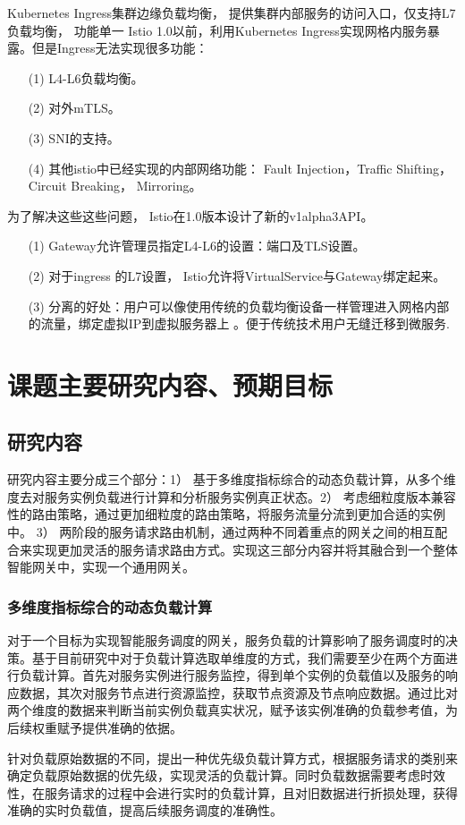 Kubernetes Ingress集群边缘负载均衡， 提供集群内部服务的访问入口，仅支持L7负载均衡， 功能单一
Istio 1.0以前，利用Kubernetes Ingress实现网格内服务暴露。但是Ingress无法实现很多功能：
\begin{itemize}
    \item[(1)] L4-L6负载均衡。
    \item[(2)] 对外mTLS。
    \item[(3)] SNI的支持。
    \item[(4)] 其他istio中已经实现的内部网络功能： Fault Injection，Traffic Shifting， Circuit Breaking， Mirroring。
\end{itemize}
为了解决这些这些问题， Istio在1.0版本设计了新的v1alpha3API。
\begin{itemize}
    \item[(1)] Gateway允许管理员指定L4-L6的设置：端口及TLS设置。
    \item[(2)] 对于ingress 的L7设置， Istio允许将VirtualService与Gateway绑定起来。
    \item[(3)] 分离的好处：用户可以像使用传统的负载均衡设备一样管理进入网格内部的流量，绑定虚拟IP到虚拟服务器上 。便于传统技术用户无缝迁移到微服务.
\end{itemize}

\newpage

\section{课题主要研究内容、预期目标}

\subsection{研究内容}

研究内容主要分成三个部分：1） 基于多维度指标综合的动态负载计算，从多个维度去对服务实例负载进行计算和分析服务实例真正状态。2） 考虑细粒度版本兼容性的路由策略，通过更加细粒度的路由策略，将服务流量分流到更加合适的实例中。 3） 两阶段的服务请求路由机制，通过两种不同着重点的网关之间的相互配合来实现更加灵活的服务请求路由方式。实现这三部分内容并将其融合到一个整体智能网关中，实现一个通用网关。\par

\subsubsection{多维度指标综合的动态负载计算}

对于一个目标为实现智能服务调度的网关，服务负载的计算影响了服务调度时的决策。基于目前研究中对于负载计算选取单维度的方式，我们需要至少在两个方面进行负载计算。首先对服务实例进行服务监控，得到单个实例的负载值以及服务的响应数据，其次对服务节点进行资源监控，获取节点资源及节点响应数据。通过比对两个维度的数据来判断当前实例负载真实状况，赋予该实例准确的负载参考值，为后续权重赋予提供准确的依据。\par
针对负载原始数据的不同，提出一种优先级负载计算方式，根据服务请求的类别来确定负载原始数据的优先级，实现灵活的负载计算。同时负载数据需要考虑时效性，在服务请求的过程中会进行实时的负载计算，且对旧数据进行折损处理，获得准确的实时负载值，提高后续服务调度的准确性。

